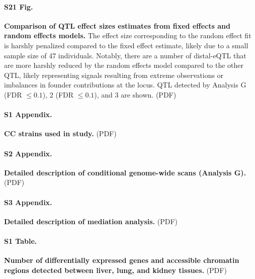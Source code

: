 \documentclass[10pt,letterpaper]{article}
\begin{document}
\paragraph*{S21 Fig.}
\label{S_qtl_effect_size_fixefvsranef}
{\bf Comparison of QTL effect sizes estimates from fixed effects and random effects models.}
The effect size corresponding to the random effect fit is harshly penalized compared to the fixed effect estimate, likely due to a small sample size of 47 individuals. Notably, there are a number of distal-eQTL that are more harshly reduced by the random effects model compared to the other QTL, likely representing signals resulting from extreme observations or imbalances in founder contributions at the locus. QTL detected by Analysis G (FDR $\le 0.1$), 2 (FDR $\le 0.1$), and 3 are shown. (PDF)


\paragraph*{S1 Appendix.}
\label{S1_Appendix}
{\bf CC strains used in study.} 
(PDF)

\paragraph*{S2 Appendix.}
\label{S2_Appendix}
{\bf Detailed description of conditional genome-wide scans (Analysis G).}
(PDF)

\paragraph*{S3 Appendix.}
\label{S3_Appendix}
{\bf Detailed description of mediation analysis.}
(PDF)

\paragraph*{S1 Table.}
\label{S_de}
{\bf Number of differentially expressed genes and accessible chromatin regions detected between liver, lung, and kidney tissues.} 
(PDF)
\end{document}
